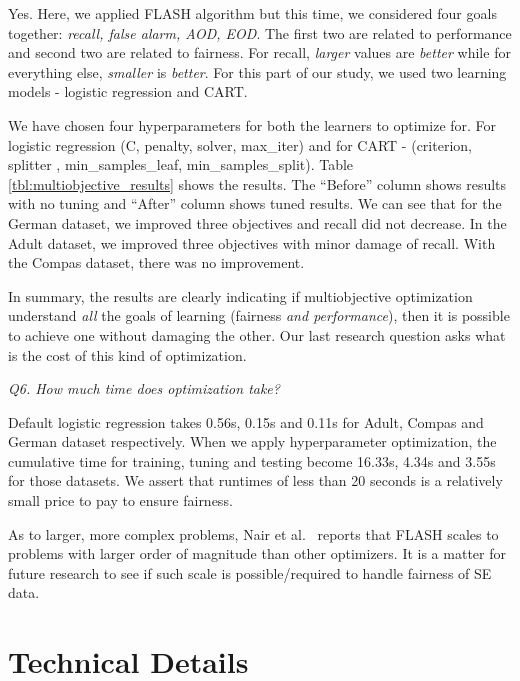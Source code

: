 \documentclass{NSF}
\begin{document}
\begin{nsfdescription}
Yes. Here, we applied  FLASH algorithm but this time, we considered four goals together: \textit{recall, false alarm, AOD, EOD}. The first two are related to performance and second two are related to fairness. For
recall, {\em larger} values are {\em better} while for everything
else, {\em smaller} is {\em better}.
 For this part of our study, we used two learning models - logistic regression and CART. 
 
 We have chosen four hyperparameters for both the learners to optimize for. For logistic regression (C, penalty, solver, max\_iter) and for CART - (criterion, splitter , min\_samples\_leaf, min\_samples\_split). Table \ref{tbl:multiobjective_results} shows the results. The ``Before'' column shows results with no tuning and ``After'' column shows tuned results. We can see that for
 the German dataset, we improved three objectives and recall did not decrease. In the Adult dataset, we improved three objectives with minor damage of recall. 
 With the
 Compas dataset, there was no improvement. 
 
 In summary, the results are clearly indicating if  multiobjective  optimization understand {\em all} the goals of learning
 (fairness {\em and performance}), then it is possible to achieve one without
 damaging the other. Our last research question asks  what is the cost of this kind of optimization.

{\em Q6. How much time does optimization take?}

Default logistic regression takes 0.56s, 0.15s and 0.11s for Adult, Compas and German dataset respectively. When we apply hyperparameter optimization, the cumulative time for training, tuning and testing become 16.33s, 4.34s and 3.55s for those datasets. 
We assert that  runtimes of less than 20 seconds is a relatively small price to pay to ensure fairness. 

As to larger, more complex problems, Nair et al.~\cite{8469102} reports
that FLASH scales to problems with larger order of magnitude than other optimizers. It is a matter for future research to see if such scale is possible/required to handle fairness of SE data. 




\section{ Technical Details}\label{tion:details}




\end{nsfdescription}
\end{document}
